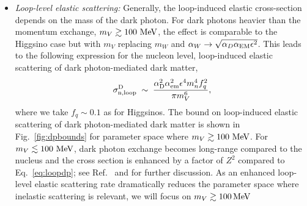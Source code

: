 \documentclass[11pt]{article}
\newcommand{\kev}{{\rm keV}}
\newcommand{\gev}{{\rm GeV}}
\newcommand{\mev}{{\rm MeV}}
\begin{document}
\begin{itemize}
Choosing two sample $\delta$ values, we can use the formalism of Sec. \ref{sec:rate} to calculate the sensitivities from current and potential high recoil searches and overlay them on the $(m_V, \epsilon)$ plane. In the left hand panel, $\delta = 300\, \kev$, and we see the upper left triangle of parameter space, roughly from $\epsilon > 3\times 10^{-7}$ for  $m_V = 0.1\, \gev$ to $\epsilon > 0.1$ for $m_V = 100\, \gev$ could be ruled out by high recoil xenon studies. Analysis of current data estimated in this study, weakens this bound by roughly an order of magnitude, with the strongest limits coming from PICO (dashed, cyan line). Increasing $\delta$ to $400\, \kev$, shown in the right panel of Fig.~\ref{fig:dpbounds}, no currently existing study can provide a bound. However, future analysis of high recoil tungsten data can exclude $\epsilon \ge 10^{-5}$ for $m_V = 0.1\, \gev$ to $\epsilon \ge 0.1$ for $m_V = 10\, \gev$. For reasons explained in the next bullet point, we do not consider dark photon masses lighter than $0.1$ GeV in Fig.~\ref{fig:dpbounds}.

\item{\it Loop-level elastic scattering:} Generally, the loop-induced elastic cross-section depends on the mass of the dark photon. For dark photons heavier than the momentum exchange, $m_V \gtrsim 100~{\rm MeV}$, the effect is comparable to the Higgsino case but with $m_V$ replacing $m_W$ and $\alpha_W \rightarrow \sqrt{\alpha_D\alpha_{\rm EM} \epsilon^2}$. This leads to the following expression for the nucleon level, loop-induced elastic scattering of dark photon-mediated dark matter,
\begin{equation}
\sigma_{\rm n,loop}^{\rm D} \; \sim \; \frac{\alpha_{\rm D}^2 \alpha_{\rm em}^2 \epsilon^4 m_n^4 f_q^2}{\pi m_V^6},
\label{eq:loopdp}
\end{equation}
where we take $f_q \sim 0.1$ as for Higgsinos. The bound on loop-induced elastic scattering of dark photon-mediated dark matter is shown in Fig.~\ref{fig:dpbounds} for parameter space where $m_V \gtrsim 100~{\rm MeV}$. For $m_V \lesssim 100~{\rm MeV}$, dark photon exchange becomes long-range compared to the nucleus and the cross section is enhanced by a factor of $Z^2$ compared to Eq.~\eqref{eq:loopdp}; see Ref.~\cite{Batell:2009vb} and \cite{Weiner:2012cb} for further discussion. As an enhanced loop-level elastic scattering rate dramatically reduces the parameter space where inelastic scattering is relevant, we will focus on $m_V \gtrsim 100\, \mev$


\end{itemize}
\end{document}
